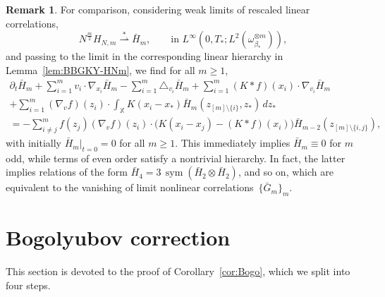 \documentclass[a4paper,11pt,reqno,noindent]{amsart}
\theoremstyle{plain}
\theoremstyle{definition}
\newtheorem{rem}[theor]{Remark}
\numberwithin{equation}{section}
\newcommand{\Xd}{\mathbb X}
\newcommand{\Sym}{{\operatorname{sym}}}
\begin{document}
\begin{rem}
For comparison, considering weak limits of rescaled linear correlations,
\[N^\frac m2H_{N,m}\overset*\rightharpoonup \bar H_m,\qquad\text{in $L^\infty(0,T_*;L^2(\omega_{\beta_*}^{\otimes m}))$},\]
and passing to the limit in the corresponding linear hierarchy in Lemma~\ref{lem:BBGKY-HNm}, we find for all $m\ge1$,
\begin{multline*}
\partial_t\bar H_{m}
+\sum_{i=1}^mv_i\cdot\nabla_{x_i}\bar H_{m}-\sum_{i=1}^m\triangle_{v_i}\bar H_{m}+\sum_{i=1}^m(K\ast f)(x_i)\cdot\nabla_{v_i}\bar H_{m}\\
+\sum_{i=1}^m(\nabla_{v} f)(z_i)\cdot\int_\Xd K(x_i-x_*)\bar H_{m}(z_{[m]\setminus\{i\}},z_*)\,dz_*\\
=-\sum_{i\ne j}^mf(z_j)(\nabla_vf)(z_i)\cdot\Big(K(x_i-x_j)-(K\ast f)(x_i)\Big)\bar H_{m-2}(z_{[m]\setminus\{i,j\}}),
\end{multline*}
with initially $\bar H_m|_{t=0}=0$ for all $m\ge1$. This immediately implies $\bar H_m\equiv0$ for $m$ odd, while terms of even order satisfy a nontrivial hierarchy. In fact, the latter implies relations of the form $\bar H_4=3\,\Sym(\bar H_2\otimes\bar H_2)$, and so on, which are equivalent to the vanishing of limit nonlinear correlations~$\{\bar G_m\}_m$.
\end{rem}

\section{Bogolyubov correction}
This section is devoted to the proof of Corollary~\ref{cor:Bogo}, which we split into four steps.
\end{document}

